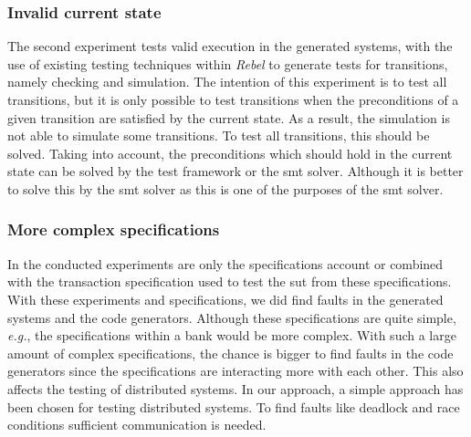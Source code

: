 \subsubsection{Invalid current state}

The second experiment tests valid execution in the generated systems, with the
use of existing testing techniques within \textit{Rebel} to generate tests for
transitions, namely checking and simulation. The intention of this experiment is
to test all transitions, but it is only possible to test transitions when the
preconditions of a given transition are satisfied by the current state.
As a result, the simulation is not able to simulate some transitions.
To test all transitions, this should be solved. Taking into account, the
preconditions which should hold in the current state can be solved by the test
framework or the \gls{smt} solver. Although it is better to solve this by the
\gls{smt} solver as this is one of the purposes of the \gls{smt} solver.

\subsubsection{More complex specifications}

In the conducted experiments are only the specifications account or combined
with the transaction specification used to test the \gls{sut} from these
specifications. With these experiments and specifications, we did find faults in
the generated systems and the code generators. Although these specifications are
quite simple, \textit{e.g.}, the specifications within a bank would be more
complex. With such a large amount of complex specifications, the chance is
bigger to find faults in the code generators since the specifications are
interacting more with each other.
This also affects the testing of distributed systems. In our approach, a
simple approach has been chosen for testing distributed systems. To find faults
like deadlock and race conditions sufficient communication is needed.
